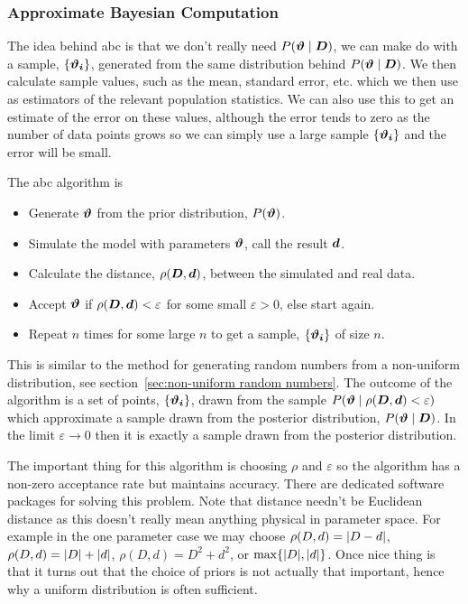 \documentclass[a4paper]{article}
\newcommand{\st}{\mid}
\begin{document}
    \subsubsection{Approximate Bayesian Computation}
    The idea behind \gls{abc} is that we don't really need \(P(\vv{\vartheta}\st\vv{D})\), we can make do with a sample, \(\{\bm{\vartheta_i}\}\), generated from the same distribution behind \(P(\vv{\vartheta}\st\vv{D})\).
    We then calculate sample values, such as the mean, standard error, etc. which we then use as estimators of the relevant population statistics.
    We can also use this to get an estimate of the error on these values, although the error tends to zero as the number of data points grows so we can simply use a large sample \(\{\bm{\vartheta_i}\}\) and the error will be small.
    
    The \gls{abc} algorithm is
    \begin{itemize}
        \item Generate \(\bm{\vartheta}\) from the prior distribution, \(P(\bm{\vartheta})\).
        \item Simulate the model with parameters \(\bm{\vartheta}\), call the result \(\bm{d}\).
        \item Calculate the distance, \(\rho(\bm{D}, \bm{d})\), between the simulated and real data.
        \item Accept \(\bm{\vartheta}\) if \(\rho(\bm{D}, \bm{d}) < \varepsilon\) for some small \(\varepsilon > 0\), else start again.
        \item Repeat \(n\) times for some large \(n\) to get a sample, \(\{\bm{\vartheta_i}\}\) of size \(n\).
    \end{itemize}
    This is similar to the method for generating random numbers from a non-uniform distribution, see section~\ref{sec:non-uniform random numbers}.
    The outcome of the algorithm is a set of points, \(\{\bm{\vartheta_i}\}\), drawn from the sample \(P(\vv{\vartheta}\st\rho(\vv{D}, \vv{d}) < \varepsilon)\) which approximate a sample drawn from the posterior distribution, \(P(\vv{\vartheta}\st\vv{D})\).
    In the limit \(\varepsilon\to 0\) then it is exactly a sample drawn from the posterior distribution.
    
    The important thing for this algorithm is choosing \(\rho\) and \(\varepsilon\) so the algorithm has a non-zero acceptance rate but maintains accuracy.
    There are dedicated software packages for solving this problem.
    Note that distance needn't be Euclidean distance as this doesn't really mean anything physical in parameter space.
    For example in the one parameter case we may choose \(\rho(D, d) = \abs{D - d}\), \(\rho(D, d) = \abs{D} + \abs{d}\), \(\rho(D, d) = D^2 + d^2\), or \(\max\{\abs{D}, \abs{d}\}\).
    Once nice thing is that it turns out that the choice of priors is not actually that important, hence why a uniform distribution is often sufficient.
    
\end{document}
